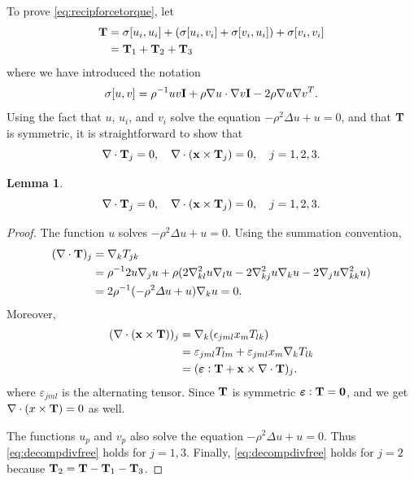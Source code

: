\documentclass[lineno]{jfm}
\newtheorem{lemma}{Lemma}
\newcommand{\xx}{\mathbf{x}}
\begin{document}
To prove \eqref{eq:recipforcetorque},
let \begin{align*}
  {\bf T}
  &=
  \sigma[u_i,u_i]
  +(\sigma[u_i,v_i]
  +\sigma[v_i,u_i])
  +\sigma[v_i,v_i] \\
  &= {\bf T}_1 + {\bf T}_2 + {\bf T}_3
\end{align*}
where we have introduced the notation
\[
\sigma[u,v]
= \rho^{-1} uv {\bf I} + \rho \nabla u \cdot \nabla v {\bf I} - 2 \rho \nabla u \nabla v^T.
\]
Using the fact that $u$, $u_i$, and $v_i$ solve the equation
$-\rho^2 \Delta u + u = 0$, and that ${\bf T}$ is symmetric,
it is straightforward to show that 
  \begin{equation}
    \label{eq:decompdivfree}
    \nabla \cdot {\bf T}_j = 0, \quad
    \nabla \cdot (\xx \times {\bf T}_j) = 0,\quad j = 1, 2, 3.
  \end{equation}
  
\begin{lemma}
  \label{eq:stress_div_lemma}
  \begin{equation}
    \label{eq:decompdivfree}
    \nabla \cdot {\bf T}_j = 0, \quad
    \nabla \cdot (\xx \times {\bf T}_j) = 0,\quad j = 1, 2, 3.
  \end{equation}
\end{lemma}
\begin{proof}
  The function $u$ solves $-\rho^2 \Delta u + u = 0$. Using the summation convention, 
  \begin{align*}
    (\nabla \cdot {\bf T})_j &=
    \nabla_k   T_{jk} \\
    &= \rho^{-1} 2u \nabla_j u + \rho(2\nabla_{kl}^2 u \nabla_l u  - 2 \nabla_{kj}^2 u \nabla_k u
    - 2 \nabla_j u \nabla_{kk}^2 u )\\
    &=2\rho^{-1}(-\rho^2 \Delta u + u)\nabla_k u = 0.
  \end{align*}
Moreover, 
  \begin{align*}
    (\nabla \cdot (\xx \times {\bf T} ))_j
    &= \nabla_k (\epsilon_{jml}x_m T_{lk})\\
    &= \varepsilon_{jml} T_{lm} + \varepsilon_{jml}x_m \nabla_k T_{lk}\\
    &= (\boldsymbol{\varepsilon}:{\bf T} + {\bf x} \times \nabla \cdot {\bf T})_j.
  \end{align*}
  where $\varepsilon_{jml}$ is the alternating tensor. 
  Since ${\bf T}$ is symmetric $\boldsymbol{\varepsilon}:{\bf T} = {\bf 0}$, and we get
  $\nabla \cdot (x \times {\bf T}) = 0$ as well.

  The functions $u_p$ and $v_p$ also solve the equation $-\rho^2 \Delta u + u = 0$.  Thus
  \eqref{eq:decompdivfree} holds for $j = 1, 3$. Finally,
  \eqref{eq:decompdivfree} holds for $j = 2$ because
  ${\bf T}_2 = {\bf T} - {\bf T}_1 - {\bf T}_3$.
\end{proof}
\end{document}
